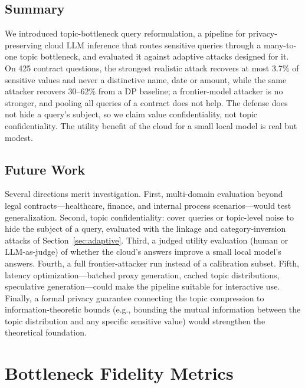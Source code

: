 \documentclass[sigconf,balance=false]{acmart}
\begin{document}
\subsection{Summary}
\label{sec:summary}

We introduced topic-bottleneck query reformulation, a pipeline for privacy-preserving cloud LLM inference that routes sensitive queries through a many-to-one topic bottleneck, and evaluated it against adaptive attacks designed for it. On 425 contract questions, the strongest realistic attack recovers at most 3.7\% of sensitive values and never a distinctive name, date or amount, while the same attacker recovers 30--62\% from a DP baseline; a frontier-model attacker is no stronger, and pooling all queries of a contract does not help. The defense does not hide a query's subject, so we claim value confidentiality, not topic confidentiality. The utility benefit of the cloud for a small local model is real but modest.

\subsection{Future Work}
\label{sec:future}

Several directions merit investigation. First, multi-domain evaluation beyond legal contracts---healthcare, finance, and internal process scenarios---would test generalization. Second, topic confidentiality: cover queries or topic-level noise to hide the subject of a query, evaluated with the linkage and category-inversion attacks of Section~\ref{sec:adaptive}. Third, a judged utility evaluation (human or LLM-as-judge) of whether the cloud's answers improve a small local model's answers. Fourth, a full frontier-attacker run instead of a calibration subset. Fifth, latency optimization---batched proxy generation, cached topic distributions, speculative generation---could make the pipeline suitable for interactive use. Finally, a formal privacy guarantee connecting the topic compression to information-theoretic bounds (e.g., bounding the mutual information between the topic distribution and any specific sensitive value) would strengthen the theoretical foundation.

\clearpage



\appendix

\section{Bottleneck Fidelity Metrics}
\label{app:fidelity}
\end{document}

